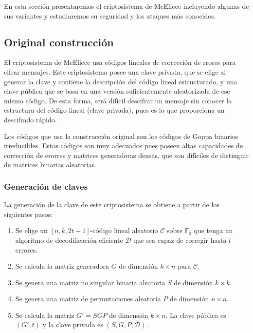 En esta sección presentaremos el criptosistema de McEliece incluyendo algunas de sus variantes y estudiaremos su seguridad y los ataques más conocidos.

\subsection{Original construcción}

El criptosistema de McEliece usa códigos lineales de corrección de rrores para cifrar mensajes. Este criptosistema posee una clave privada, que se elige al generar la clave y contiene la descripción del código lineal estructurado, y una clave pública que se basa en una versión suficientemente aleatorizada de ese mismo código. De esta forma, será difícil descifrar un mensaje sin conocer la estructura del código lineal (clave privada), pues es lo que proporciona un descifrado rápido.

Los códigos que usa la construcción original son los códigos de Goppa binarios irreducibles. Estos códigos son muy adecuados pues poseen altas capacidades de corrección de erorres y matrices generadoras densas, que son difíciles de distinguir de matrices binarias aleatorias.

\subsubsection{Generación de claves}

La generación de la clave de este criptosistema se obtiene a partir de los siguientes pasos:

\begin{enumerate}
    \item Se elige un $[n, k, 2t + 1]$-código lineal aleatorio $\mathcal{C}$ sobre $\mathbb{F}_2$ que tenga un algoritmo de decodificación eficiente $\mathcal{D}$ que sea capaz de corregir hasta $t$ errores.
    \item Se calcula la matriz generadora $G$ de dimensión $k \times n$ para $\mathcal{C}$.
    \item Se genera una matriz no singular binaria aleatoria $S$ de dimensión $k \times k$.
    \item Se genera una matriz de permutaciones aleatoria $P$ de dimensión $n \times n$.
    \item Se calcula la matriz $G' = SGP$ de dimensión $k \times n$. La clave pública es $(G', t)$ y la clave privada es $(S, G, P, \mathcal{D})$.
\end{enumerate}

